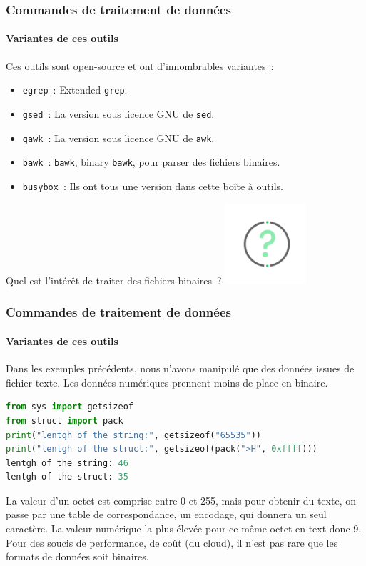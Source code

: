 \documentclass{beamer}
\begin{document}
    \begin{frame}
        \transdissolve
        \frametitle{Commandes de traitement de données}
        \framesubtitle{Variantes de ces outils}
        Ces outils sont open-source et ont d'innombrables variantes~:
        \begin{itemize}
            \item \lstinline{egrep}~: Extended \lstinline{grep}.
            \item \lstinline{gsed}~: La version sous licence GNU de \lstinline{sed}.
            \item \lstinline{gawk}~: La version sous licence GNU de \lstinline{awk}.
            \item \lstinline{bawk}~: \lstinline{bawk}, binary \lstinline{bawk}, pour parser des fichiers binaires.
            \item \lstinline{busybox}~: Ils ont tous une version dans cette boîte à outils.
        \end{itemize}
        \bigbreak
        Quel est l'intérêt de traiter des fichiers binaires~?
        \bigbreak
        \centering
        \includegraphics[width=3cm]{image/question-mark}
    \end{frame}

    \begin{frame}[fragile]
        \transdissolve
        \frametitle{Commandes de traitement de données}
        \framesubtitle{Variantes de ces outils}
        Dans les exemples précédents, nous n'avons manipulé que des données issues de fichier texte.
        Les données numériques prennent moins de place en binaire.
        \begin{lstlisting}[language=python]
from sys import getsizeof
from struct import pack
print("lentgh of the string:", getsizeof("65535"))
print("lentgh of the struct:", getsizeof(pack(">H", 0xffff)))
lentgh of the string: 46
lentgh of the struct: 35
        \end{lstlisting}
        La valeur d'un octet est comprise entre 0 et 255, mais pour obtenir du texte, on passe par une table de correspondance, un encodage, qui donnera un seul caractère.
        La valeur numérique la plus élevée pour ce même octet en text donc 9.
        \bigbreak
        Pour des soucis de performance, de coût (du cloud), il n'est pas rare que les formats de données soit binaires.
    \end{frame}
\end{document}
